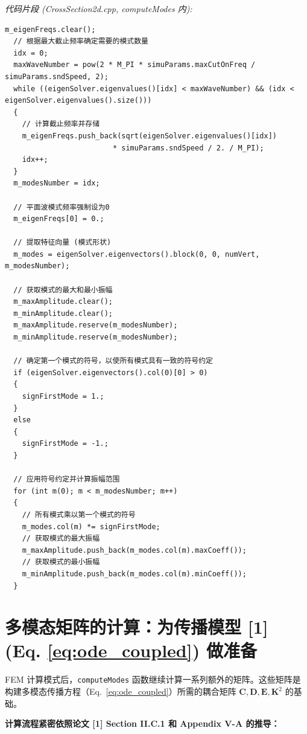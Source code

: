 \documentclass{ctexart}
\begin{document}
\textit{代码片段 (CrossSection2d.cpp, computeModes 内):}
\begin{lstlisting}[caption={提取特征值和特征向量}, label={lst:results}]
  m_eigenFreqs.clear();
  // 根据最大截止频率确定需要的模式数量
  idx = 0;
  maxWaveNumber = pow(2 * M_PI * simuParams.maxCutOnFreq / simuParams.sndSpeed, 2);
  while ((eigenSolver.eigenvalues()[idx] < maxWaveNumber) && (idx < eigenSolver.eigenvalues().size()))
  {
    // 计算截止频率并存储
    m_eigenFreqs.push_back(sqrt(eigenSolver.eigenvalues()[idx])
                         * simuParams.sndSpeed / 2. / M_PI);
    idx++;
  }
  m_modesNumber = idx;

  // 平面波模式频率强制设为0
  m_eigenFreqs[0] = 0.; 

  // 提取特征向量 (模式形状)
  m_modes = eigenSolver.eigenvectors().block(0, 0, numVert, m_modesNumber);
  
  // 获取模式的最大和最小振幅
  m_maxAmplitude.clear();
  m_minAmplitude.clear();
  m_maxAmplitude.reserve(m_modesNumber);
  m_minAmplitude.reserve(m_modesNumber);
  
  // 确定第一个模式的符号，以使所有模式具有一致的符号约定
  if (eigenSolver.eigenvectors().col(0)[0] > 0)
  {
    signFirstMode = 1.;
  }
  else
  {
    signFirstMode = -1.;
  }
  
  // 应用符号约定并计算振幅范围
  for (int m(0); m < m_modesNumber; m++)
  {
    // 所有模式乘以第一个模式的符号
    m_modes.col(m) *= signFirstMode;
    // 获取模式的最大振幅
    m_maxAmplitude.push_back(m_modes.col(m).maxCoeff());
    // 获取模式的最小振幅
    m_minAmplitude.push_back(m_modes.col(m).minCoeff());
  }
\end{lstlisting}

\section{多模态矩阵的计算：为传播模型 [1] (Eq. \eqref{eq:ode_coupled}) 做准备}
FEM 计算模式后，\texttt{computeModes} 函数继续计算一系列额外的矩阵。这些矩阵是构建多模态传播方程（Eq.~\eqref{eq:ode_coupled}）所需的耦合矩阵 $\mathbf{C}, \mathbf{D}, \mathbf{E}, \mathbf{K}^2$ 的基础。

\textbf{计算流程紧密依照论文 [1] Section II.C.1 和 Appendix V-A 的推导：}
\end{document}
